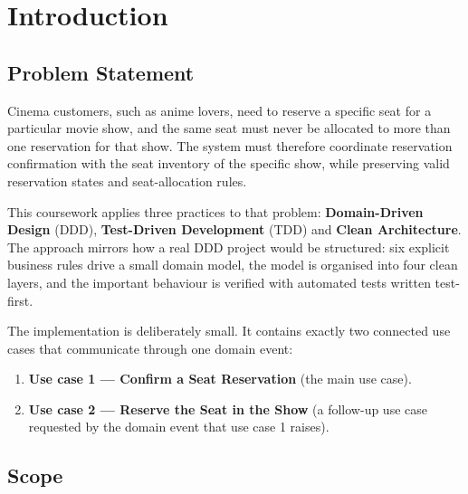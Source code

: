 \documentclass[11pt,a4paper]{article}
\begin{document}
\tableofcontents
\clearpage

\section{Introduction}

\subsection{Problem Statement}

Cinema customers, such as anime lovers, need to reserve a specific seat for a
particular movie show, and the same seat must never be allocated to more than
one reservation for that show. The system must therefore coordinate reservation
confirmation with the seat inventory of the specific show, while preserving
valid reservation states and seat-allocation rules.

This coursework applies three practices to that problem: \textbf{Domain-Driven
Design} (DDD), \textbf{Test-Driven Development} (TDD) and \textbf{Clean
Architecture}. The approach mirrors how a real DDD project would be structured:
six explicit business rules drive a small domain model, the model is organised
into four clean layers, and the important behaviour is verified with automated
tests written test-first.

The implementation is deliberately small. It contains exactly two connected use
cases that communicate through one domain event:
\begin{enumerate}
  \item \textbf{Use case 1 --- Confirm a Seat Reservation} (the main use case).
  \item \textbf{Use case 2 --- Reserve the Seat in the Show} (a follow-up use
        case requested by the domain event that use case 1 raises).
\end{enumerate}

\subsection{Scope}
\end{document}
